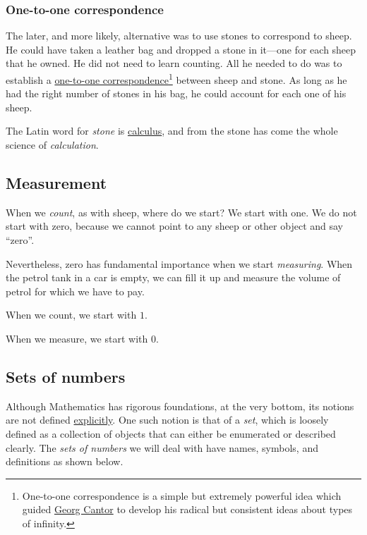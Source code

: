 \documentclass[
  a4paper,
]{article}
\begin{document}
\subsubsection{One-to-one
correspondence}\label{one-to-one-correspondence}

The later, and more likely, alternative was to use stones to correspond
to sheep. He could have taken a leather bag and dropped a stone in
it---one for each sheep that he owned. He did not need to learn
counting. All he needed to do was to establish a
\href{https://www.encyclopedia.com/science/encyclopedias-almanacs-transcripts-and-maps/one-one-correspondence}{one-to-one
correspondence}\footnote{One-to-one correspondence is a simple but
  extremely powerful idea which guided
  \href{https://www.britannica.com/science/one-to-one-correspondence}{Georg
  Cantor} to develop his radical but consistent ideas about types of
  infinity.} between sheep and stone. As long as he had the right number
of stones in his bag, he could account for each one of his sheep.

The Latin word for \emph{stone} is
\href{https://www.etymonline.com/search?q=calculus}{calculus}, and from
the stone has come the whole science of \emph{calculation}.

\subsection{Measurement}\label{measurement}

When we \emph{count}, as with sheep, where do we start? We start with
one. We do not start with zero, because we cannot point to any sheep or
other object and say ``zero''.

Nevertheless, zero has fundamental importance when we start
\emph{measuring}. When the petrol tank in a car is empty, we can fill it
up and measure the volume of petrol for which we have to pay.

When we count, we start with \(1\).

When we measure, we start with \(0\).

\subsection{Sets of numbers}\label{sets-of-numbers}

Although Mathematics has rigorous foundations, at the very bottom, its
notions are not defined
\href{https://www.vocabulary.com/dictionary/explicitly}{explicitly}. One
such notion is that of a \emph{set}, which is loosely defined as a
collection of objects that can either be enumerated or described
clearly. The \emph{sets of numbers} we will deal with have names,
symbols, and definitions as shown below.
\end{document}
